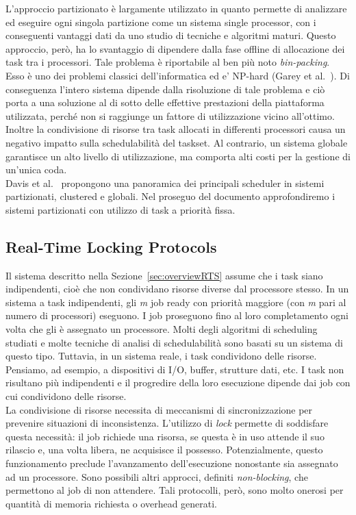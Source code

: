 L'approccio partizionato è largamente utilizzato in quanto permette di analizzare ed eseguire ogni singola partizione come un sistema single processor, con i conseguenti vantaggi dati da uno studio di tecniche e algoritmi maturi. Questo approccio, però, ha lo svantaggio di dipendere dalla fase offline di allocazione dei task tra i processori. Tale problema è riportabile al ben più noto \textit{bin-packing}. Esso è uno dei problemi classici dell'informatica ed e' NP-hard (Garey et al.~\cite{Garey:1979:CIG:578533}). Di conseguenza l'intero sistema dipende dalla risoluzione di tale problema e ciò porta a una soluzione al di sotto delle effettive prestazioni della piattaforma utilizzata, perché non si raggiunge un fattore di utilizzazione vicino all'ottimo. Inoltre la condivisione di risorse tra task allocati in differenti processori causa un negativo impatto sulla schedulabilità del taskset. Al contrario, un sistema globale garantisce un alto livello di utilizzazione, ma comporta alti costi per la gestione di un'unica coda.\\

Davis et al.~\cite{Davis:2011:SHR:1978802.1978814} propongono una panoramica dei principali scheduler in sistemi partizionati, clustered e globali. Nel proseguo del documento approfondiremo i sistemi partizionati con utilizzo di task a priorità fissa.

\subsection{Real-Time Locking Protocols}
\label{sec:lockProtocols}

Il sistema descritto nella Sezione~\ref{sec:overviewRTS} assume che i task siano indipendenti, cioè che non condividano risorse diverse dal processore stesso. In un sistema a task indipendenti, gli \textit{m} job ready con priorità maggiore (con \textit{m} pari al numero di processori) eseguono. I job proseguono fino al loro completamento ogni volta che gli è assegnato un processore. Molti degli algoritmi di scheduling studiati e molte tecniche di analisi di schedulabilità sono basati su un sistema di questo tipo. Tuttavia, in un sistema reale, i task condividono delle risorse. Pensiamo, ad esempio, a dispositivi di I/O, buffer, strutture dati, etc. I task non risultano più indipendenti e il progredire della loro esecuzione dipende dai job con cui condividono delle risorse.\\

La condivisione di risorse necessita di meccanismi di sincronizzazione per prevenire situazioni di inconsistenza. L'utilizzo di \textit{lock} permette di soddisfare questa necessità: il job richiede una risorsa, se questa è in uso attende il suo rilascio e, una volta libera, ne acquisisce il possesso. Potenzialmente, questo funzionamento preclude l'avanzamento dell'esecuzione nonostante sia assegnato ad un processore. Sono possibili altri approcci, definiti \textit{non-blocking}, che permettono al job di non attendere. Tali protocolli, però, sono molto onerosi per quantità di memoria richiesta o overhead generati.\\

